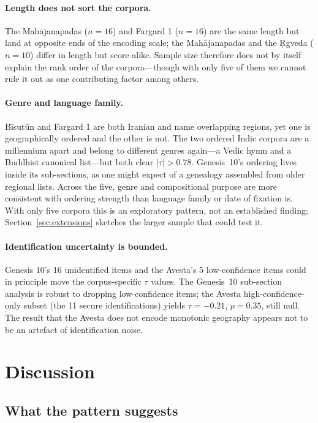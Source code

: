 \documentclass[11pt]{article}
\begin{document}
\paragraph{Length does not sort the corpora.}
The Mahājanapadas ($n=16$) and Fargard 1 ($n=16$) are the same
length but land at opposite ends of the encoding scale; the
Mahājanapadas and the Ṛgveda ($n=10$) differ in length but score
alike. Sample size therefore does not by itself explain the rank
order of the corpora---though with only five of them we cannot rule
it out as one contributing factor among others.

\paragraph{Genre and language family.}
Bīsutūn and Fargard 1 are both Iranian and name overlapping
regions, yet one is geographically ordered and the other is not.
The two ordered Indic corpora are a millennium apart and belong to
different genres again---a Vedic hymn and a Buddhist canonical
list---but both clear $|\tau| > 0.78$. Genesis~10's ordering lives
inside its sub-sections, as one might expect of a genealogy
assembled from older regional lists. Across the five, genre and
compositional purpose are more consistent with ordering strength
than language family or date of fixation is. With only five corpora
this is an exploratory pattern, not an established finding;
Section~\ref{sec:extensions} sketches the larger sample that could
test it.

\paragraph{Identification uncertainty is bounded.}
Genesis 10's 16 unidentified items and the Avesta's 5
low-confidence items could in principle move the corpus-specific
$\tau$ values. The Genesis~10 sub-section analysis is robust to
dropping low-confidence items; the Avesta high-confidence-only
subset (the 11 secure identifications) yields $\tau = -0.21$,
$p = 0.35$, still null. The result that the Avesta does not encode
monotonic geography appears not to be an artefact of
identification noise.

\section{Discussion}\label{sec:discussion}

\subsection{What the pattern suggests}\label{sec:suggests}
\end{document}
